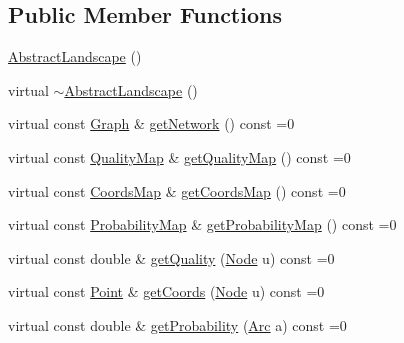 \subsection*{Public Member Functions}
\begin{DoxyCompactItemize}
\item 
\hyperlink{classconcepts_1_1_abstract_landscape_a1ef1ebd4c1a2c8fa7db1015c2f3a5ad2}{Abstract\+Landscape} ()
\item 
virtual \hyperlink{classconcepts_1_1_abstract_landscape_a1aa9716037a8210d16987793224ce305}{$\sim$\+Abstract\+Landscape} ()
\item 
virtual const \hyperlink{classconcepts_1_1_abstract_landscape_ab1988ca4ff36329c45af21e76046903d}{Graph} \& \hyperlink{classconcepts_1_1_abstract_landscape_a7ed478b62e37cad9a22bed3adedf07c5}{get\+Network} () const =0
\item 
virtual const \hyperlink{classconcepts_1_1_abstract_landscape_aab540b896ac9b7a7a5783f2a78f304ad}{Quality\+Map} \& \hyperlink{classconcepts_1_1_abstract_landscape_ab0ff4aa5ac8d95d9207e32582e3e95f2}{get\+Quality\+Map} () const =0
\item 
virtual const \hyperlink{classconcepts_1_1_abstract_landscape_a8432d7dff7edc5a5cbc524592b411f8a}{Coords\+Map} \& \hyperlink{classconcepts_1_1_abstract_landscape_a5005b0254f3c5aa0ed8505386fca92b3}{get\+Coords\+Map} () const =0
\item 
virtual const \hyperlink{classconcepts_1_1_abstract_landscape_ae90ffb759facff21b29e646539352182}{Probability\+Map} \& \hyperlink{classconcepts_1_1_abstract_landscape_a4ecbe83965a5266a3a2fa14e201c5871}{get\+Probability\+Map} () const =0
\item 
virtual const double \& \hyperlink{classconcepts_1_1_abstract_landscape_a7cab5e0f48eda3a95df9bee95a5a6358}{get\+Quality} (\hyperlink{classconcepts_1_1_abstract_landscape_a7c2f90fb9f42302f1af84a59f4df4b91}{Node} u) const =0
\item 
virtual const \hyperlink{abstract__landscape_8hpp_a9c14bcba65b035519a9c98f1eb1babbe}{Point} \& \hyperlink{classconcepts_1_1_abstract_landscape_a7d0a8d666d3c712899e34cbf6f322027}{get\+Coords} (\hyperlink{classconcepts_1_1_abstract_landscape_a7c2f90fb9f42302f1af84a59f4df4b91}{Node} u) const =0
\item 
virtual const double \& \hyperlink{classconcepts_1_1_abstract_landscape_af1e6dc428cff6f339cf1377c4487c781}{get\+Probability} (\hyperlink{classconcepts_1_1_abstract_landscape_a0966623f028fe50ac9a3ae114dcf2672}{Arc} a) const =0
\end{DoxyCompactItemize}


